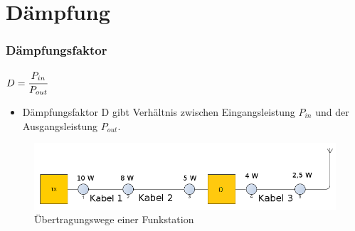 

\subtitle{Technik Klasse E 10: \\
          Dezibel, Dämpfung \& Kabel \\[2em]}
\date{Stand 14.11.2016}



\section*{Dämpfung}

\begin{frame}
  \frametitle{Dämpfungsfaktor}
  \begin{center}
    \begin{minipage}{0.3\textwidth}
      \huge{$ D = \cfrac{P_{in}}{P_{out}}$}
    \end{minipage}
    \begin{minipage}{0.6\textwidth}
      \begin{itemize}
        \item Dämpfungsfaktor D gibt Verhältnis zwischen Eingangsleistung $P_{in}$
          und der Ausgangsleistung $P_{out}$.
      \end{itemize}
    \end{minipage}
    \vspace{1cm}
    \begin{figure}
      \includegraphics[width=\textwidth,height=.4\textheight,keepaspectratio]{e10/ubertragung.png}
      \caption{Übertragungswege einer Funkstation}
    \end{figure}
  \end{center}
\end{frame}

